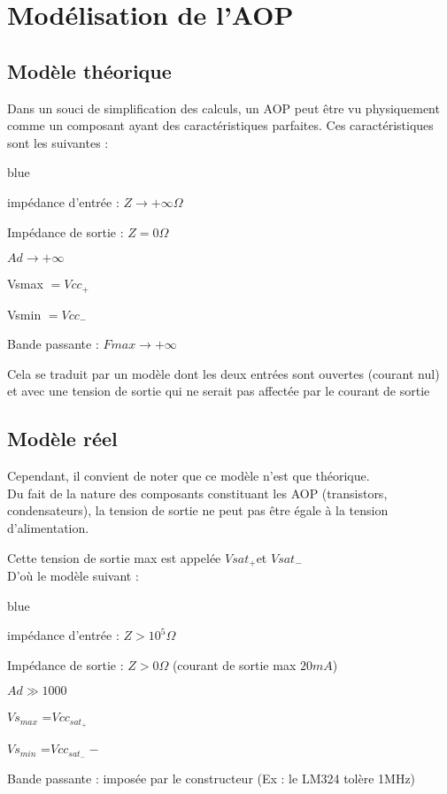 
\chapter{Modélisation de l'AOP}
\section{Modèle théorique}


Dans un souci de simplification des calculs, un AOP peut être vu physiquement comme un composant ayant des caractéristiques parfaites. 
Ces caractéristiques sont les suivantes :

\begin{items}{blue}{\Triangle}
  \item impédance d’entrée :  $Z\rightarrow+\infty \Omega$ 
  \item Impédance de sortie : $Z=0 \Omega$  
  \item $Ad\rightarrow+\infty$
  \item Vsmax $ = Vcc_+$
  \item Vsmin $ = Vcc_-$
  \item Bande passante : $Fmax\rightarrow+\infty$ 
\end{items}

Cela se traduit par un modèle dont les deux entrées sont ouvertes (courant nul) et avec une tension de sortie qui ne serait pas affectée par le courant de sortie


\section{Modèle réel} 


Cependant, il convient de noter que ce modèle n’est que théorique.\\

Du fait de la nature des composants constituant les AOP (transistors, condensateurs), la tension de sortie ne peut pas être égale à la tension d’alimentation. 

Cette tension de sortie max est appelée $Vsat_+$et $Vsat_-$ \\

D'où le modèle suivant : 

\begin{items}{blue}{\Triangle}
  \item impédance d’entrée :  $Z>10^5 \Omega$
  \item Impédance de sortie : $Z>0 \Omega$ (courant de sortie max $20mA$)
  \item $Ad \gg 1000$
  \item $Vs_{max}$ =$Vcc_{sat_+}$
  \item $Vs_{min}$ =$Vcc_{sat_-}-$
  \item Bande passante : imposée par le constructeur (Ex : le LM324 tolère 1MHz)
\end{items}


